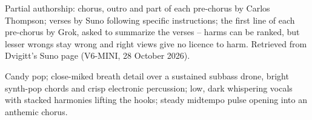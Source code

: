 
\begin{notes}
Partial authorship: chorus, outro and part of each pre-chorus by Carlos Thompson; verses by Suno following specific instructions; the first line of each pre-chorus by Grok, asked to summarize the verses -- harms can be ranked, but lesser wrongs stay wrong and right views give no licence to harm. Retrieved from Dvigitt's Suno page (V6-MINI, 28 October 2026).
\end{notes}
\begin{style}
Candy pop; close-miked breath detail over a sustained subbass drone, bright synth-pop chords and crisp electronic percussion; low, dark whispering vocals with stacked harmonies lifting the hooks; steady midtempo pulse opening into an anthemic chorus.
\end{style}
